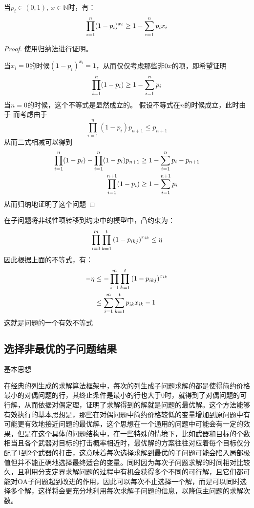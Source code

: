 \begin{proposition}
    当$p_i \in (0, 1),\ x \in \mathbb{N}$时，有： 
    \begin{equation*}
        \prod_{i=1}^{n}(1-p_i)^{x_i} \geq 1 - \sum_{i=1}^{n} p_i x_i
    \end{equation*}
\end{proposition}
\begin{proof}
    使用归纳法进行证明。

    当$x_i = 0$的时候$(1-p_i)^{x_i} = 1$，从而仅仅考虑那些非0$x$的项，即希望证明
    \begin{equation*}
        \prod_{i=1}^{n}(1-p_i) \geq 1 - \sum_{i=1}^{n} p_i
    \end{equation*}
    当$n=0$的时候，这个不等式是显然成立的。
    假设不等式在$n$的时候成立，此时由于
    而考虑由于
    \begin{equation*}
        \prod_{i=1}^{n}(1-p_i) p_{n+1} \leq p_{n+1}
    \end{equation*}
    从而二式相减可以得到
    \begin{align*}
        \prod_{i=1}^{n}(1-p_i) - \prod_{i=1}^{n}(1-p_i) p_{n+1} &\geq 1 - \sum_{i=1}^{n} p_i - p_{n+1} \\
        \prod_{i=1}^{n + 1}(1-p_i) &\geq 1 - \sum_{i=1}^{n + 1} p_i
    \end{align*}
    从而归纳地证明了这个问题
\end{proof}

在子问题将非线性项转移到约束中的模型中，凸约束为：
\begin{equation*}
    \prod_{i=1}^{m}{\prod_{k=1}^{t}{\left( 1-p_{ikj} \right) ^{x_{ik}}}} \leq \eta
\end{equation*}
因此根据上面的不等式，有：
\begin{align*}
	-\eta &\leq - \prod_{i=1}^{m}{\prod_{k=1}^{t}{\left( 1-p_{ikj} \right) ^{x_{ik}}}} \\ 
	&\leq \sum_{i=1}^{m}{\sum_{k=1}^{t}{p_{ik} x_{ik} - 1}}\\
\end{align*}
这就是问题的一个有效不等式


\subsection{选择非最优的子问题结果}
基本思想

在经典的列生成的求解算法框架中，每次的列生成子问题求解的都是使得简约价格最小的对偶问题的行，其终止条件是最小的行也大于0时，就得到了对偶问题的可行解，从而依据对偶定理，证明了求解得到的解就是问题的最优解。这个方法能够有效执行的基本思想是，那些在对偶问题中简约价格较低的变量增加到原问题中有可能更有效地接近问题的最优解，这个思想在一个通用的问题中可能会有一定的效果，但是在这个具体的问题结构中，在一些特殊的情境下，比如武器和目标的个数相当且各个武器对目标的打击概率相近时，最优解的方案往往对应着每个目标仅分配了1到2个武器的打击，这意味着每次选择求解到最优的子问题可能会陷入局部极值但并不能正确地选择最终适合的变量。同时因为每次子问题求解的时间相对比较久，且利用分支定界求解问题的过程中有机会获得多个不同的可行解，且它们都可能对OA子问题起到改进的作用，因此可以每次不止选择一个解，而是可以同时选择多个解，这样将会更充分地利用每次求解子问题的信息，以降低主问题的求解次数。

